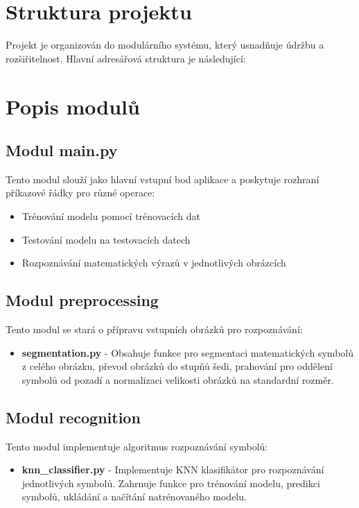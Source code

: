 \section{Struktura projektu}

Projekt je organizován do modulárního systému, který usnadňuje údržbu a rozšiřitelnost. Hlavní adresářová struktura je následující:



\section{Popis modulů}

\subsection{Modul main.py}

Tento modul slouží jako hlavní vstupní bod aplikace a poskytuje rozhraní příkazové řádky pro různé operace:
\begin{itemize}
    \item Trénování modelu pomocí trénovacích dat
    \item Testování modelu na testovacích datech
    \item Rozpoznávání matematických výrazů v jednotlivých obrázcích
\end{itemize}

\subsection{Modul preprocessing}

Tento modul se stará o přípravu vstupních obrázků pro rozpoznávání:

\begin{itemize}
    \item \textbf{segmentation.py} - Obsahuje funkce pro segmentaci matematických symbolů z celého obrázku, převod obrázků do stupňů šedi, prahování pro oddělení symbolů od pozadí a normalizaci velikosti obrázků na standardní rozměr.
\end{itemize}

\subsection{Modul recognition}

Tento modul implementuje algoritmus rozpoznávání symbolů:

\begin{itemize}
    \item \textbf{knn\_classifier.py} - Implementuje KNN klasifikátor pro rozpoznávání jednotlivých symbolů. Zahrnuje funkce pro trénování modelu, predikci symbolů, ukládání a načítání natrénovaného modelu.
\end{itemize}

